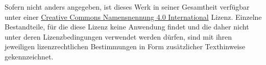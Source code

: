 \begin{small}
  Sofern nicht anders angegeben, ist dieses Werk in seiner Gesamtheit verfügbar unter einer \href{https://creativecommons.org/licenses/by/4.0/}{\foreignlanguage{english}{Creative Commons} Namensnennung 4.0 International} Lizenz. %
  Einzelne Bestandteile, für die diese Lizenz keine Anwendung findet und die daher nicht unter deren Lizenzbedingungen verwendet werden dürfen, sind mit ihren jeweiligen lizenzrechtlichen Bestimmungen in Form zusätzlicher Texthinweise gekennzeichnet.
  \par
\end{small}
